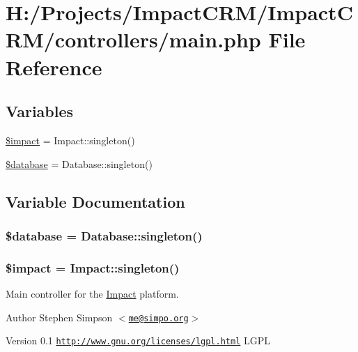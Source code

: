 \hypertarget{main_8php}{
\section{H:/Projects/ImpactCRM/ImpactCRM/controllers/main.php File Reference}
\label{main_8php}
}
\subsection*{Variables}
\begin{DoxyCompactItemize}
\item 
\hyperlink{main_8php_aa2b1d90a164e1b0d5e34333b25e2d94f}{\$impact} = Impact::singleton()
\item 
\hyperlink{main_8php_a7691c0162d89de0b6ba47edcd8ba8878}{\$database} = Database::singleton()
\end{DoxyCompactItemize}


\subsection{Variable Documentation}
\hypertarget{main_8php_a7691c0162d89de0b6ba47edcd8ba8878}{
\subsubsection[{\$database}]{\setlength{\rightskip}{0pt plus 5cm}\$database = Database::singleton()}}
\label{main_8php_a7691c0162d89de0b6ba47edcd8ba8878}
\hypertarget{main_8php_aa2b1d90a164e1b0d5e34333b25e2d94f}{
\subsubsection[{\$impact}]{\setlength{\rightskip}{0pt plus 5cm}\$impact = Impact::singleton()}}
\label{main_8php_aa2b1d90a164e1b0d5e34333b25e2d94f}
Main controller for the \hyperlink{namespaceImpact}{Impact} platform.

\begin{DoxyAuthor}{Author}
Stephen Simpson $<$\href{mailto:me@simpo.org}{\tt me@simpo.org}$>$ 
\end{DoxyAuthor}
\begin{DoxyVersion}{Version}
0.1  \href{http://www.gnu.org/licenses/lgpl.html}{\tt http://www.gnu.org/licenses/lgpl.html} LGPL 
\end{DoxyVersion}
